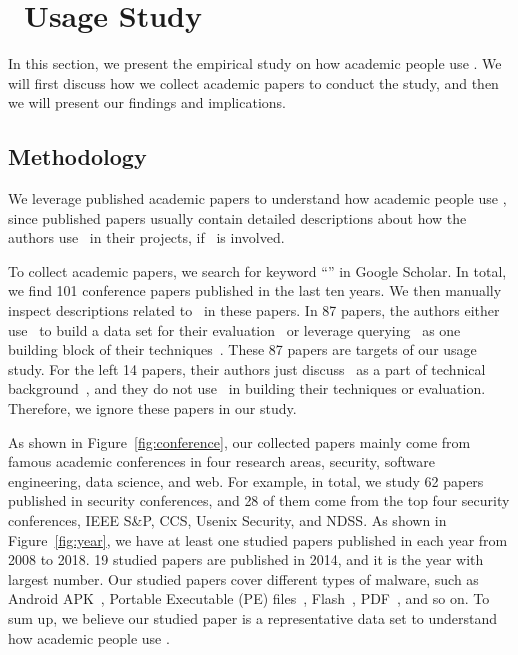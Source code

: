 \section{\vt\ Usage Study}

In this section, we present the empirical study on how 
academic people use \vt. 
We will first discuss how we collect academic papers to conduct the study, 
and then we will present our findings and implications. 

\subsection{Methodology}

We leverage published academic papers to understand 
how academic people use \vt,
since published papers usually contain detailed descriptions 
about how the authors use \vt\ in their projects, if \vt\ is involved. 

To collect academic papers, we search for keyword ``\vt'' in Google Scholar. 
In total, we find 101 conference papers published in the last ten years.
We then manually inspect descriptions related to \vt\ in these papers. 
In 87 papers, the authors either use \vt\ 
to build a data set for their evaluation~\cite{ford2009analyzing,android-1,email-vt-1,kharraz2016unveil} 
or leverage querying \vt\ as one building block of their
techniques~\cite{vt-component-1,vt-component-2,vt-component-3}. 
These 87 papers are targets of our \vt{} usage study. 
For the left 14 papers, their authors just discuss \vt\ as a part 
of technical background~\cite{not-use-1,bayer2009scalable,jiang2012dissecting}, and 
they do not use \vt\ in building their techniques or evaluation. 
Therefore, we ignore these papers in our study. 




As shown in Figure~\ref{fig:conference}, 
our collected papers mainly come from famous academic conferences 
in four research areas, security, software engineering, data science, and web. 
For example, in total, we study 62 papers published in security conferences,
and 28 of them come from the top four security conferences, 
IEEE S\&P, CCS, Usenix Security, and NDSS.
As shown in Figure~\ref{fig:year}, 
we have at least one studied papers 
published in each year from 2008 to 2018. 
19 studied papers are published in 2014, 
and it is the year with largest number. 
Our studied papers cover different types of malware, 
such as Android APK~\cite{android-1,arp2014drebin,huangvt2016bigdata}, 
Portable Executable (PE) files~\cite{bayer2009scalable,pe-vt-1,pe-vt-2}, 
Flash~\cite{ford2009analyzing,wressnegger2017looking}, 
PDF~\cite{pdf-vt-1,carmony2016extract}, and so on. 
To sum up, we believe our studied paper is a representative data set 
to understand how academic people use \vt{}. 

